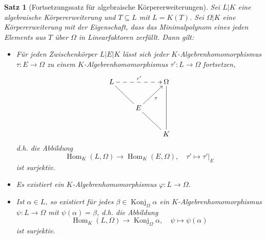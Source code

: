 \documentclass[a4paper, twoside, 11pt, ngerman]{report}
\DeclareMathOperator{\Hom}{Hom}
\DeclareMathOperator{\Konj}{Konj}
\theoremstyle{definistyle}
\newtheorem{satz}{Satz}[section]
\theoremstyle{remark}
\begin{document}
\begin{satz}[Fortsetzungssatz für algebraische Körpererweiterungen]\label{satz:fortsetzungssatz_algebraische_koerpererweiterungen}
Sei $L|K$ eine algebraische Körpererweiterung und $T \subseteq L$ mit $L = K(T)$. Sei $\Omega|K$ eine Körpererweiterung mit der Eigenschaft, dass das Minimalpolynom eines jeden Elements aus $T$ über $\Omega$ in Linearfaktoren zerfällt. Dann gilt:
\begin{itemize}
    \item[(a)] Für jeden Zwischenkörper $L|E|K$ lässt sich jeder $K$-Algebrenhomomorphismus $\tau \colon E \to \Omega$ zu einem $K$-Algebrenhomomorphismus $\tau' \colon L \to \Omega$ fortsetzen,
    \[
\xymatrix{
L \ar@{-}[dr] \ar@{-->}[rr]^{\tau'} & & \Omega \ar@{-}[dd] \\
 & E \ar[ur]_\tau \ar@{-}[dr] &  \\
 & & K
}
\]
d.h. die Abbildung
\[
\Hom_K(L,\Omega)\to\Hom_K(E,\Omega), \quad \tau'\mapsto \tau'|_E
\]
ist surjektiv.
    \item[(b)] Es existiert ein $K$-Algebrenhomomorphismus $\varphi \colon L \to \Omega$.
    \item[(c)] Ist $\alpha \in L$, so existiert für jedes $\beta \in \Konj_\Omega\alpha$ ein $K$-Algebrenhomomorphismus $\psi \colon L \to \Omega$ mit $\psi(\alpha) = \beta$, d.h.
    die Abbildung
    \[
    \Hom_K(L,\Omega)\to \Konj_\Omega\alpha, \quad \psi\mapsto\psi(\alpha)
    \]
    ist surjektiv.
\end{itemize}
\end{satz}
\end{document}
